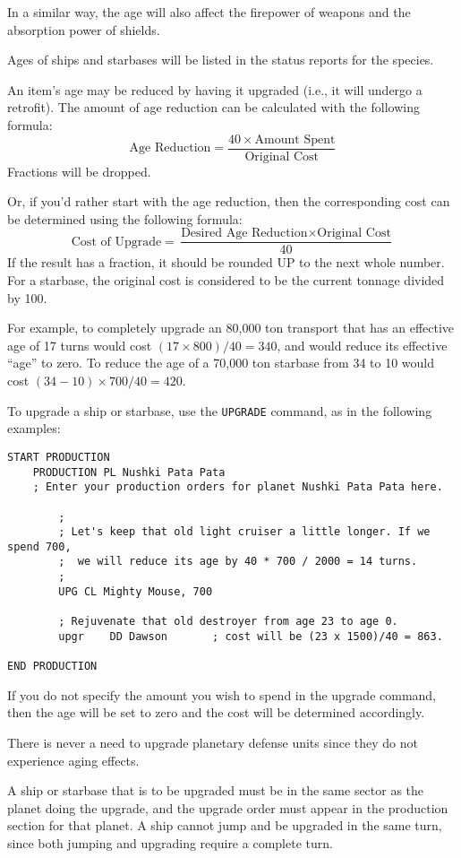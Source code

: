 \documentclass[10pt,titlepage]{article}
\begin{document}
In a similar way, the age will also affect the firepower of weapons and the
absorption power of shields.

Ages of ships and starbases will be listed in the status reports for the
species.

An item's age may be reduced by having it upgraded (i.e., it will undergo a
retrofit).  The amount of age reduction can be calculated with the following
formula:
\[
	\textrm{Age Reduction}  =  \dfrac{40  \times  \textrm{Amount Spent}}{\textrm{Original Cost}}
\]
Fractions will be dropped.

Or, if you'd rather start with the age reduction, then the corresponding cost
can be determined using the following formula:
\[
	\textrm{Cost of Upgrade}  =  \dfrac{\textrm{Desired Age Reduction}  \times  \textrm{Original Cost}}{40}
\]
If the result has a fraction, it should be rounded UP to the next whole number.
For a starbase, the original cost is considered to be the current tonnage
divided by 100.

For example, to completely upgrade an 80,000 ton transport that has an
effective age of 17 turns would cost $(17 \times 800) / 40 = 340$, and would reduce
its effective ``age'' to zero.  To reduce the age of a 70,000 ton starbase
from 34 to 10 would cost $(34 - 10) \times 700 / 40 = 420$.

To upgrade a ship or starbase, use the \texttt{UPGRADE} command, as in the following
examples:

\begin{verbatim}
START PRODUCTION
    PRODUCTION PL Nushki Pata Pata
    ; Enter your production orders for planet Nushki Pata Pata here.

        ;
        ; Let's keep that old light cruiser a little longer. If we spend 700,
        ;  we will reduce its age by 40 * 700 / 2000 = 14 turns.
        ;
        UPG CL Mighty Mouse, 700

        ; Rejuvenate that old destroyer from age 23 to age 0.
        upgr    DD Dawson       ; cost will be (23 x 1500)/40 = 863.

END PRODUCTION
\end{verbatim} 

If you do not specify the amount you wish to spend in the upgrade command, then
the age will be set to zero and the cost will be determined accordingly.

There is never a need to upgrade planetary defense units since they do not
experience aging effects.

A ship or starbase that is to be upgraded must be in the same sector as the
planet doing the upgrade, and the upgrade order must appear in the production
section for that planet.  A ship cannot jump and be upgraded in the same turn,
since both jumping and upgrading require a complete turn.
\end{document}
